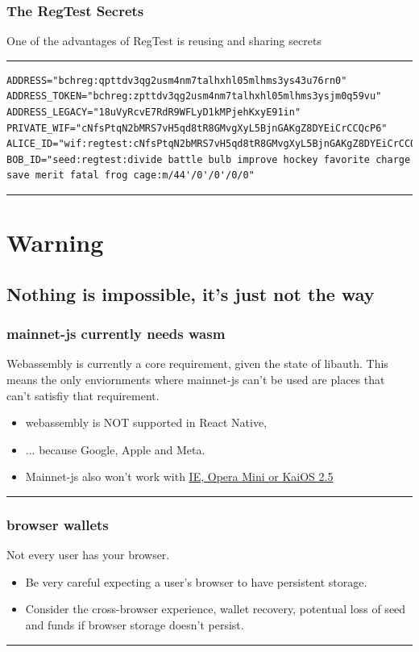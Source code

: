 \documentclass{beamer}
\begin{document}
\begin{frame}[fragile]
    \frametitle{The RegTest Secrets}
    One of the advantages of RegTest is reusing and sharing secrets  
    \rule{\textwidth}{0.4pt}
    \tiny
    \begin{verbatim}
ADDRESS="bchreg:qpttdv3qg2usm4nm7talhxhl05mlhms3ys43u76rn0"
ADDRESS_TOKEN="bchreg:zpttdv3qg2usm4nm7talhxhl05mlhms3ysjm0q59vu"
ADDRESS_LEGACY="18uVyRcvE7RdR9WFLyD1kMPjehKxyE91in"
PRIVATE_WIF="cNfsPtqN2bMRS7vH5qd8tR8GMvgXyL5BjnGAKgZ8DYEiCrCCQcP6"
ALICE_ID="wif:regtest:cNfsPtqN2bMRS7vH5qd8tR8GMvgXyL5BjnGAKgZ8DYEiCrCCQcP6"
BOB_ID="seed:regtest:divide battle bulb improve hockey favorite charge save merit fatal frog cage:m/44'/0'/0'/0/0"

    \end{verbatim}
\rule{\textwidth}{0.4pt}
\end{frame}

\section{Warning}

\subsection[Not the way]{Nothing is impossible, it's just not the way}

\begin{frame}[fragile]
  \frametitle{mainnet-js currently needs wasm}

  Webassembly is currently a core requirement, given the state of libauth.  This 
  means the only enviornments where mainnet-js can't be used are places that can't satisfiy that requirement.
\begin{itemize}
  \item
    webassembly is \alert{NOT} supported in React Native,
  \item
    ... because Google, Apple and Meta. 
    \item
    Mainnet-js also won't work with \href{https://caniuse.com/wasm}{IE, Opera Mini or KaiOS 2.5}
  \end{itemize}
      
\rule{\textwidth}{0.9pt}
\end{frame}


\begin{frame}[fragile]
  \frametitle{browser wallets}

  Not every user has your browser.
\begin{itemize}
  \item
    Be very careful expecting a user's browser to have persistent storage.
  \item
    Consider the cross-browser experience, wallet recovery, potentual loss of seed and funds if browser storage doesn't persist.
  \end{itemize}
      
\rule{\textwidth}{0.9pt}
\end{frame}
\end{document}
